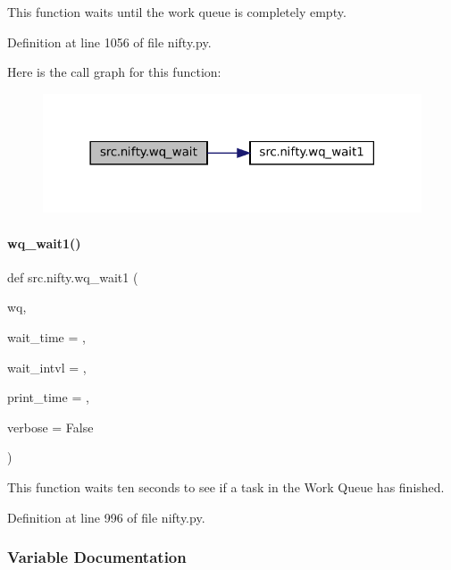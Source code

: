 This function waits until the work queue is completely empty. 



Definition at line 1056 of file nifty.\+py.

Here is the call graph for this function\+:
\nopagebreak
\begin{figure}[H]
\begin{center}
\leavevmode
\includegraphics[width=318pt]{namespacesrc_1_1nifty_a1f6829e41379fd0b24c3cc2f4d6a8036_cgraph}
\end{center}
\end{figure}
\mbox{\label{namespacesrc_1_1nifty_a751edc0be54afcd841c93b4132cfb291}} 
\paragraph{\texorpdfstring{wq\+\_\+wait1()}{wq\_wait1()}}
{\footnotesize\ttfamily def src.\+nifty.\+wq\+\_\+wait1 (\begin{DoxyParamCaption}\item[{}]{wq,  }\item[{}]{wait\+\_\+time = {},  }\item[{}]{wait\+\_\+intvl = {},  }\item[{}]{print\+\_\+time = {},  }\item[{}]{verbose = {\ttfamily False} }\end{DoxyParamCaption})}



This function waits ten seconds to see if a task in the Work Queue has finished. 



Definition at line 996 of file nifty.\+py.



\subsubsection{Variable Documentation}
\mbox{\label{namespacesrc_1_1nifty_ad20028ef80e371a25d47a02a01ac5f90}} 
